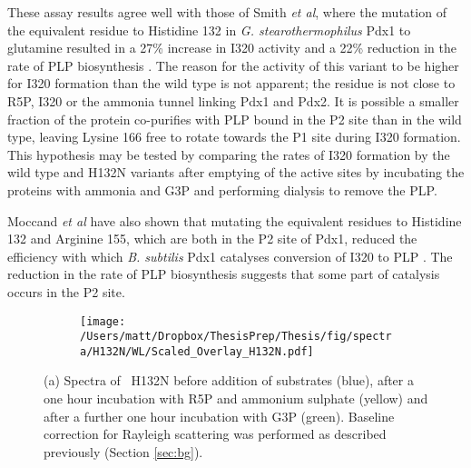 These assay results agree well with those of Smith \textit{et al}, where the mutation of the equivalent residue to Histidine 132 in \textit{G. stearothermophilus} Pdx1 to glutamine resulted in a 27\% increase in I320 activity and a 22\% reduction in the rate of PLP biosynthesis \cite{Smith2015}. The reason for the activity of this variant to be higher for I320 formation than the wild type is not apparent; the residue is not close to R5P, I320 or the ammonia tunnel linking Pdx1 and Pdx2. It is possible a smaller fraction of the protein co-purifies with PLP bound in the P2 site than in the wild type, leaving Lysine 166 free to rotate towards the P1 site during I320 formation. This hypothesis may be tested by comparing the rates of I320 formation by the wild type and H132N variants after emptying of the active sites by incubating the proteins with ammonia and G3P and performing dialysis to remove the PLP. 

Moccand \textit{et al} have also shown that mutating the equivalent residues to Histidine 132 and Arginine 155, which are both in the P2 site of Pdx1, reduced the efficiency with which \textit{B. subtilis} Pdx1 catalyses conversion of I320 to PLP \cite{Moccand2011}. The reduction in the rate of PLP biosynthesis suggests that some part of catalysis occurs in the P2 site. 

   
\begin{figure}[!htbp]
\centering
\begin{subfigure}{.49\textwidth}
  \centering
  \texttt{[image: /Users/matt/Dropbox/ThesisPrep/Thesis/fig/spectra/H132N/WL/Scaled\_Overlay\_H132N.pdf]}	
  \caption{}
  \label{fig:pdx1_H132N_spectra}
\end{subfigure}
\caption[Spectra of \atpdx ~H132N in solution]{(a) Spectra of \atpdx ~H132N before addition of substrates (blue), after a one hour incubation with R5P and ammonium sulphate (yellow) and after a further one hour incubation with G3P (green). Baseline correction for Rayleigh scattering was performed as described previously (Section \ref{sec:bg}).}
\end{figure}      
\clearpage

